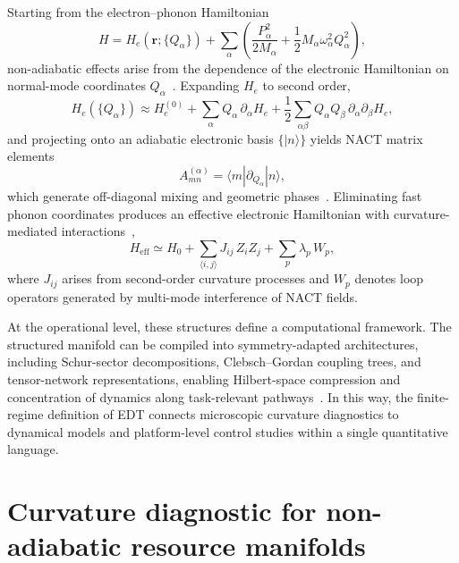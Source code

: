 ﻿\documentclass[aps,prx,reprint,superscriptaddress,longbibliography,floatfix]{revtex4-2}
\begin{document}
Starting from the electron--phonon Hamiltonian
\begin{equation}
H = H_e(\mathbf{r};\{Q_\alpha\}) + \sum_\alpha \left(\frac{P_\alpha^2}{2M_\alpha} + \frac{1}{2} M_\alpha \omega_\alpha^2 Q_\alpha^2\right),
\end{equation}
non-adiabatic effects arise from the dependence of the electronic Hamiltonian on normal-mode coordinates $Q_\alpha$~\cite{BornOppenheimer1927,Mead1979,Yarkony1996}. Expanding $H_e$ to second order,
\begin{equation}
H_e(\{Q_\alpha\}) \approx H_e^{(0)} + \sum_\alpha Q_\alpha \,\partial_\alpha H_e + \frac{1}{2}\sum_{\alpha\beta} Q_\alpha Q_\beta \,\partial_\alpha \partial_\beta H_e,
\end{equation}
and projecting onto an adiabatic electronic basis $\{|n\rangle\}$ yields NACT matrix elements
\begin{equation}
A^{(\alpha)}_{mn} = \langle m | \partial_{Q_\alpha} | n \rangle,
\end{equation}
which generate off-diagonal mixing and geometric phases~\cite{Berry1984}. Eliminating fast phonon coordinates produces an effective electronic Hamiltonian with curvature-mediated interactions~\cite{SchriefferWolff1966,LangFirsov1962},
\begin{equation}
H_{\mathrm{eff}} \simeq H_0 + \sum_{\langle i,j\rangle} J_{ij}\, Z_i Z_j + \sum_p \lambda_p\, W_p,
\end{equation}
where $J_{ij}$ arises from second-order curvature processes and $W_p$ denotes loop operators generated by multi-mode interference of NACT fields.

At the operational level, these structures define a computational framework. The structured manifold can be compiled into symmetry-adapted architectures, including Schur-sector decompositions, Clebsch--Gordan coupling trees, and tensor-network representations, enabling Hilbert-space compression and concentration of dynamics along task-relevant pathways~\cite{Bacon2006}. In this way, the finite-regime definition of EDT connects microscopic curvature diagnostics to dynamical models and platform-level control studies within a single quantitative language.


\section{Curvature diagnostic for non-adiabatic resource manifolds}
\end{document}
